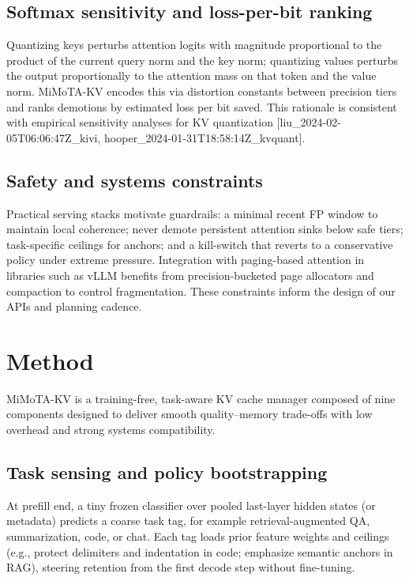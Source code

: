 \documentclass{article} %
\begin{document}
\subsection{Softmax sensitivity and loss-per-bit ranking}
Quantizing keys perturbs attention logits with magnitude proportional to the product of the current query norm and the key norm; quantizing values perturbs the output proportionally to the attention mass on that token and the value norm. MiMoTA-KV encodes this via distortion constants between precision tiers and ranks demotions by estimated loss per bit saved. This rationale is consistent with empirical sensitivity analyses for KV quantization [liu\_2024-02-05T06:06:47Z\_kivi, hooper\_2024-01-31T18:58:14Z\_kvquant].

\subsection{Safety and systems constraints}
Practical serving stacks motivate guardrails: a minimal recent FP window to maintain local coherence; never demote persistent attention sinks below safe tiers; task-specific ceilings for anchors; and a kill-switch that reverts to a conservative policy under extreme pressure. Integration with paging-based attention in libraries such as vLLM benefits from precision-bucketed page allocators and compaction to control fragmentation. These constraints inform the design of our APIs and planning cadence.

\section{Method}
\label{sec:method}
MiMoTA-KV is a training-free, task-aware KV cache manager composed of nine components designed to deliver smooth quality–memory trade-offs with low overhead and strong systems compatibility.

\subsection{Task sensing and policy bootstrapping}
At prefill end, a tiny frozen classifier over pooled last-layer hidden states (or metadata) predicts a coarse task tag, for example retrieval-augmented QA, summarization, code, or chat. Each tag loads prior feature weights and ceilings (e.g., protect delimiters and indentation in code; emphasize semantic anchors in RAG), steering retention from the first decode step without fine-tuning.
\end{document}
